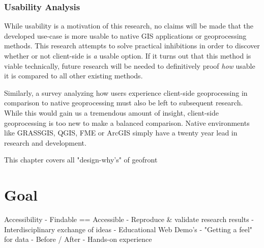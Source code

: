\subsubsection*{ Usability Analysis } %

While usability is a motivation of this research, no claims will be made that the developed use-case is more usable to native GIS applications or geoprocessing methods. This research attempts to solve practical inhibitions in order to discover whether or not client-side is \emph{a} usable option. If it turns out that this method is viable technically, future research will be needed to definitively proof \emph{how} usable it is compared to all other existing methods.  


Similarly, a survey analyzing how users experience client-side geoprocessing in comparison to native geoprocessing must also be left to subsequent research. While this would gain us a tremendous amount of insight, client-side geoprocessing is too new to make a balanced comparison. Native environments like GRASSGIS, QGIS, FME or ArcGIS simply have a twenty year lead in research and development. 










This chapter covers all "design-why's" of geofront 

\section{Goal}

Accessibility
- Findable == Accessible
- Reproduce \& validate research results 
- Interdisciplinary exchange of ideas 
- Educational Web Demo's
- "Getting a feel" for data 
   - Before / After
   - Hands-on experience


